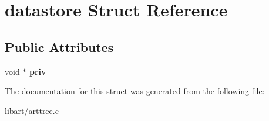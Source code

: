 \hypertarget{structdatastore}{}\section{datastore Struct Reference}
\label{structdatastore}
\subsection*{Public Attributes}
\begin{DoxyCompactItemize}
\item 
\mbox{\label{structdatastore_a7acbd30899b87641a3cae41289a50367}} 
void $\ast$ {\bfseries priv}
\end{DoxyCompactItemize}


The documentation for this struct was generated from the following file\+:\begin{DoxyCompactItemize}
\item 
libart/arttree.\+c\end{DoxyCompactItemize}
